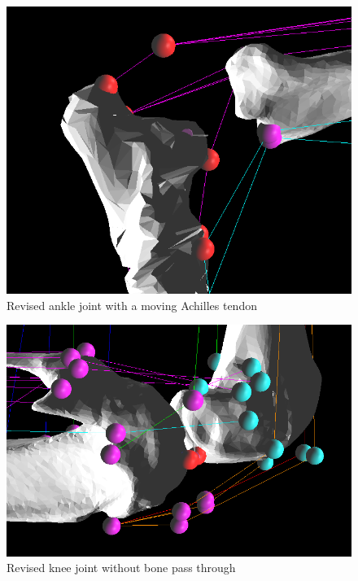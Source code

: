 \documentclass[runningheads,a4paper]{llncs}
\begin{document}
			\begin{figure}
				\centering
				\includegraphics[width=.5\textwidth]{att4.PNG}
				\caption{Revised ankle joint with a moving Achilles tendon}
			\end{figure}
			\begin{figure}
				\centering
				\begin{minipage}{0.6\textwidth}
					\centering
				\includegraphics[width=\textwidth]{att5.PNG}
				\caption{Revised knee joint without bone pass through}
				\end{minipage}\hfill
				\begin{minipage}{0.4\textwidth}
					\centering

\end{minipage}
\end{figure}
\end{document}
